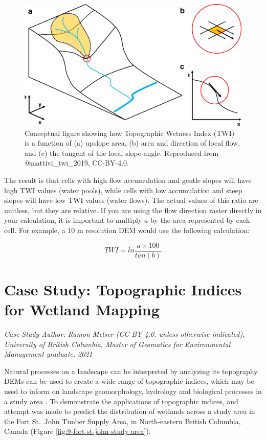 \documentclass[
]{book}
\begin{document}
\begin{figure}
\includegraphics[width=0.75\linewidth]{images/09-Mattivi-et-al-2019-figure-1} \caption{Conceptual figure showing how Topographic Wetness Index (TWI) is a function of (a) upslope area, (b) area and direction of local flow, and (c) the tangent of the local slope angle. Reproduced from @mattivi_twi_2019, CC-BY-4.0.}\label{fig:9-Mattivi-et-al-2019-figure-1}
\end{figure}

The result is that cells with high flow accumulation and gentle slopes will have high TWI values (water pools), while cells with low accumulation and steep slopes will have low TWI values (water flows). The actual values of this ratio are unitless, but they are relative. If you are using the flow direction raster directly in your calculation, it is important to multiply \(a\) by the area represented by each cell. For example, a 10 m resolution DEM would use the following calculation:

\[
TWI=ln\frac{a×100}{tan(b)}
\]

\section{Case Study: Topographic Indices for Wetland Mapping}\label{case-study-topographic-indices-for-wetland-mapping}

\emph{Case Study Author: Ramon Melser (CC BY 4.0. unless otherwise indicated), University of British Columbia, Master of Geomatics for Environmental Management graduate, 2021}

Natural processes on a landscape can be interpreted by analyzing its topography. DEMs can be used to create a wide range of topographic indices, which may be used to inform on landscape geomorphology, hydrology and biological processes in a study area \citep{mattivi_twi_2019}. To demonstrate the applications of topographic indices, and attempt was made to predict the distribution of wetlands across a study area in the Fort St.~John Timber Supply Area, in North-eastern British Columbia, Canada (Figure \ref{fig:9-fort-st-john-study-area}).
\end{document}
